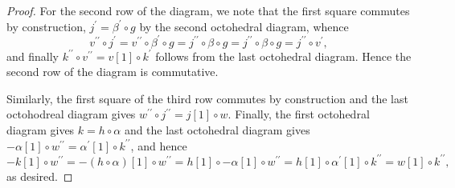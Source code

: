 \documentclass[dissertation.tex]{subfiles}
\begin{document}
\begin{prop}
\begin{proof}
    For the second row of the diagram, we note that the first square commutes by construction,
    $j^\prime = \beta^\prime \circ g$ by the second octohedral diagram, whence
    $$v^{\prime\prime} \circ j^\prime = v^{\prime\prime} \circ \beta^\prime \circ g = j^{\prime\prime} \circ \beta \circ g = j^{\prime\prime} \circ \beta \circ g = j^{\prime\prime} \circ v^\prime,$$
    and finally $k^{\prime\prime} \circ v^{\prime\prime} = v[1] \circ k^\prime$ follows from the last octohedral diagram.
    Hence the second row of the diagram is commutative.
    
    Similarly, the first square of the third row commutes by construction and the last octohodreal diagram gives $w^{\prime\prime} \circ j^{\prime\prime} = j[1] \circ w$.
    Finally, the first octohedral diagram gives $k = h \circ \alpha$ and the last octohedral diagram gives $-\alpha[1] \circ w^{\prime\prime} = \alpha^\prime[1] \circ k^{\prime\prime}$, and hence    
    $$-k[1] \circ w^{\prime\prime} = -(h \circ \alpha)[1] \circ w^{\prime\prime} = h[1] \circ -\alpha[1] \circ w^{\prime\prime} = h[1] \circ \alpha^\prime[1] \circ k^{\prime\prime} = w[1] \circ k^{\prime\prime},$$
    as desired.
  \end{proof}
\end{prop}
\end{document}
